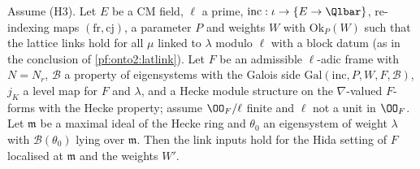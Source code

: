 \begin{proposition}\label{pf:onto2:winputs}
Assume (H3). Let $E$ be a CM field, $\ell$ a prime, $\mathrm{inc}:\iota\to\{E\to\Qlbar\}$, re-indexing maps $(\mathrm{fr},\mathrm{cj})$,
a parameter $P$ and weights $W$ with $\mathrm{Ok}_P(W)$ such that the lattice links hold for all $\mu$ linked to $\lambda$ modulo
$\ell$ with a block datum (as in the conclusion of \cref{pf:onto2:latlink}). Let $F$ be an admissible $\ell$-adic frame with $N=N_r$,
$\mathcal B$ a property of eigensystems with the Galois side $\mathrm{Gal}(\mathrm{inc},P,W,F,\mathcal B)$, $j_K$ a level map for $F$
and $\lambda$, and a Hecke module structure on the $\nabla$-valued $F$-forms with the Hecke property; assume $\OO_F/\ell$ finite and $\ell$
not a unit in $\OO_F$. Let $\mathfrak m$ be a maximal ideal of the Hecke ring and $\theta_0$ an eigensystem of weight $\lambda$ with
$\mathcal B(\theta_0)$ lying over $\mathfrak m$. Then the link inputs hold for the Hida setting of $F$ localised at $\mathfrak m$ and the
weights $W'$.
\end{proposition}

